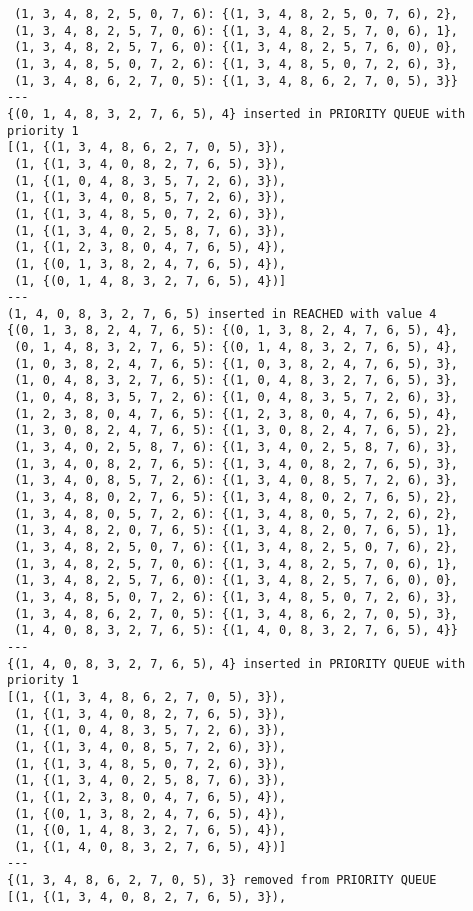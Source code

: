 \documentclass{article}
\begin{document}
\begin{verbatim}
 (1, 3, 4, 8, 2, 5, 0, 7, 6): {(1, 3, 4, 8, 2, 5, 0, 7, 6), 2},
 (1, 3, 4, 8, 2, 5, 7, 0, 6): {(1, 3, 4, 8, 2, 5, 7, 0, 6), 1},
 (1, 3, 4, 8, 2, 5, 7, 6, 0): {(1, 3, 4, 8, 2, 5, 7, 6, 0), 0},
 (1, 3, 4, 8, 5, 0, 7, 2, 6): {(1, 3, 4, 8, 5, 0, 7, 2, 6), 3},
 (1, 3, 4, 8, 6, 2, 7, 0, 5): {(1, 3, 4, 8, 6, 2, 7, 0, 5), 3}}
---
{(0, 1, 4, 8, 3, 2, 7, 6, 5), 4} inserted in PRIORITY QUEUE with priority 1
[(1, {(1, 3, 4, 8, 6, 2, 7, 0, 5), 3}),
 (1, {(1, 3, 4, 0, 8, 2, 7, 6, 5), 3}),
 (1, {(1, 0, 4, 8, 3, 5, 7, 2, 6), 3}),
 (1, {(1, 3, 4, 0, 8, 5, 7, 2, 6), 3}),
 (1, {(1, 3, 4, 8, 5, 0, 7, 2, 6), 3}),
 (1, {(1, 3, 4, 0, 2, 5, 8, 7, 6), 3}),
 (1, {(1, 2, 3, 8, 0, 4, 7, 6, 5), 4}),
 (1, {(0, 1, 3, 8, 2, 4, 7, 6, 5), 4}),
 (1, {(0, 1, 4, 8, 3, 2, 7, 6, 5), 4})]
---
(1, 4, 0, 8, 3, 2, 7, 6, 5) inserted in REACHED with value 4
{(0, 1, 3, 8, 2, 4, 7, 6, 5): {(0, 1, 3, 8, 2, 4, 7, 6, 5), 4},
 (0, 1, 4, 8, 3, 2, 7, 6, 5): {(0, 1, 4, 8, 3, 2, 7, 6, 5), 4},
 (1, 0, 3, 8, 2, 4, 7, 6, 5): {(1, 0, 3, 8, 2, 4, 7, 6, 5), 3},
 (1, 0, 4, 8, 3, 2, 7, 6, 5): {(1, 0, 4, 8, 3, 2, 7, 6, 5), 3},
 (1, 0, 4, 8, 3, 5, 7, 2, 6): {(1, 0, 4, 8, 3, 5, 7, 2, 6), 3},
 (1, 2, 3, 8, 0, 4, 7, 6, 5): {(1, 2, 3, 8, 0, 4, 7, 6, 5), 4},
 (1, 3, 0, 8, 2, 4, 7, 6, 5): {(1, 3, 0, 8, 2, 4, 7, 6, 5), 2},
 (1, 3, 4, 0, 2, 5, 8, 7, 6): {(1, 3, 4, 0, 2, 5, 8, 7, 6), 3},
 (1, 3, 4, 0, 8, 2, 7, 6, 5): {(1, 3, 4, 0, 8, 2, 7, 6, 5), 3},
 (1, 3, 4, 0, 8, 5, 7, 2, 6): {(1, 3, 4, 0, 8, 5, 7, 2, 6), 3},
 (1, 3, 4, 8, 0, 2, 7, 6, 5): {(1, 3, 4, 8, 0, 2, 7, 6, 5), 2},
 (1, 3, 4, 8, 0, 5, 7, 2, 6): {(1, 3, 4, 8, 0, 5, 7, 2, 6), 2},
 (1, 3, 4, 8, 2, 0, 7, 6, 5): {(1, 3, 4, 8, 2, 0, 7, 6, 5), 1},
 (1, 3, 4, 8, 2, 5, 0, 7, 6): {(1, 3, 4, 8, 2, 5, 0, 7, 6), 2},
 (1, 3, 4, 8, 2, 5, 7, 0, 6): {(1, 3, 4, 8, 2, 5, 7, 0, 6), 1},
 (1, 3, 4, 8, 2, 5, 7, 6, 0): {(1, 3, 4, 8, 2, 5, 7, 6, 0), 0},
 (1, 3, 4, 8, 5, 0, 7, 2, 6): {(1, 3, 4, 8, 5, 0, 7, 2, 6), 3},
 (1, 3, 4, 8, 6, 2, 7, 0, 5): {(1, 3, 4, 8, 6, 2, 7, 0, 5), 3},
 (1, 4, 0, 8, 3, 2, 7, 6, 5): {(1, 4, 0, 8, 3, 2, 7, 6, 5), 4}}
---
{(1, 4, 0, 8, 3, 2, 7, 6, 5), 4} inserted in PRIORITY QUEUE with priority 1
[(1, {(1, 3, 4, 8, 6, 2, 7, 0, 5), 3}),
 (1, {(1, 3, 4, 0, 8, 2, 7, 6, 5), 3}),
 (1, {(1, 0, 4, 8, 3, 5, 7, 2, 6), 3}),
 (1, {(1, 3, 4, 0, 8, 5, 7, 2, 6), 3}),
 (1, {(1, 3, 4, 8, 5, 0, 7, 2, 6), 3}),
 (1, {(1, 3, 4, 0, 2, 5, 8, 7, 6), 3}),
 (1, {(1, 2, 3, 8, 0, 4, 7, 6, 5), 4}),
 (1, {(0, 1, 3, 8, 2, 4, 7, 6, 5), 4}),
 (1, {(0, 1, 4, 8, 3, 2, 7, 6, 5), 4}),
 (1, {(1, 4, 0, 8, 3, 2, 7, 6, 5), 4})]
---
{(1, 3, 4, 8, 6, 2, 7, 0, 5), 3} removed from PRIORITY QUEUE
[(1, {(1, 3, 4, 0, 8, 2, 7, 6, 5), 3}),

\end{verbatim}
\end{document}

